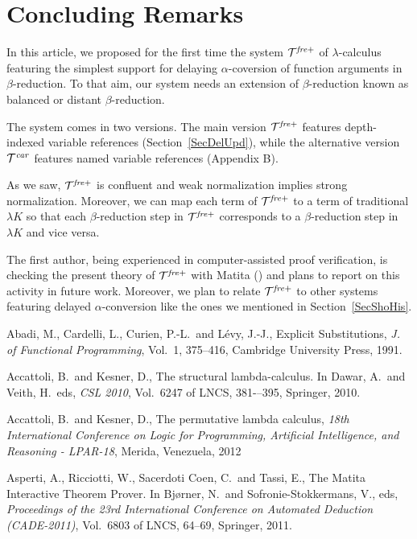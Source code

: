 \documentclass{article}
\theoremstyle{plain}
\theoremstyle{definition}
\begin{document}
{\section{Concluding Remarks}\label{SecConRem} 


In this article, we proposed for the first time the system ${\cal T}^{\it fre+}$ of
$\lambda$-calculus featuring the simplest support for delaying
$\alpha$-coversion of function arguments in $\beta$-reduction.
To that aim, our system needs an extension of $\beta$-reduction known
as balanced or distant $\beta$-reduction.

The system comes in two versions.
The main version ${\cal T}^{\it fre+}$ features depth-indexed variable references (Section~\ref{SecDelUpd}),
while the alternative version ${\cal T}^{\it car}$ features named variable references (Appendix B).

As we saw, ${\cal T}^{\it fre+}$ is confluent
and weak normalization implies strong normalization.
Moreover, we can map each term of ${\cal T}^{\it fre+}$ to a term of
traditional $\lambda K$ so that each $\beta$-reduction step in ${\cal T}^{\it fre+}$
corresponds to a $\beta$-reduction step in $\lambda K$ and vice versa.

The first author, being experienced in computer-assisted proof verification,
is checking the present theory of ${\cal T}^{\it fre+}$ with Matita (\citealp{Asp,Gui14})
and plans to report on this activity in future work.
Moreover, we plan to relate ${\cal T}^{\it fre+}$ to
other systems featuring delayed $\alpha$-conversion
like the ones we mentioned in Section~\ref{SecShoHis}.


\begin{thebibliography}{8}
Abadi, M., Cardelli, L., Curien, P.-L.\ and L\'evy, J.-J.,
Explicit Substitutions, {\em J. of Functional Programming\/}, Vol.\ 1, 375--416,
Cambridge University Press, 1991.

Accattoli, B.\ and Kesner, D., The structural lambda-calculus. In Dawar, A.\ and
Veith, H.\, eds, {\em CSL 2010\/}, Vol.\ 6247 of LNCS, 381-–395, Springer, 2010.

Accattoli, B.\ and Kesner, D., The permutative lambda calculus, {\em 18th International Conference on Logic for Programming, Artificial Intelligence, and Reasoning - LPAR-18\/}, Merida,
Venezuela, 2012

Asperti, A., Ricciotti, W., Sacerdoti Coen, C.\ and Tassi, E.,
The Matita Interactive Theorem Prover. In Bj{\o}rner, N.\ and Sofronie-Stokkermans, V., eds,
{\em Proceedings of the 23rd International Conference on Automated Deduction (CADE-2011)}, Vol.\ 6803 of LNCS, 64--69, Springer, 2011.


\end{thebibliography}}
\end{document}
